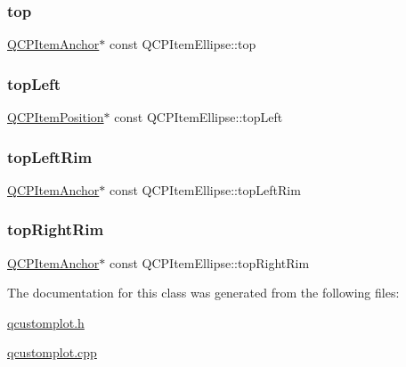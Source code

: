 \mbox{\label{class_q_c_p_item_ellipse_ad50f907d6f9d1402c6c5d302dca5c5d5}} 
\subsubsection{\texorpdfstring{top}{top}}
{\footnotesize\ttfamily \hyperlink{class_q_c_p_item_anchor}{Q\+C\+P\+Item\+Anchor}$\ast$ const Q\+C\+P\+Item\+Ellipse\+::top}

\mbox{\label{class_q_c_p_item_ellipse_a12fd8420c06718d0c8a2303d6a652848}} 
\subsubsection{\texorpdfstring{top\+Left}{topLeft}}
{\footnotesize\ttfamily \hyperlink{class_q_c_p_item_position}{Q\+C\+P\+Item\+Position}$\ast$ const Q\+C\+P\+Item\+Ellipse\+::top\+Left}

\mbox{\label{class_q_c_p_item_ellipse_a33ebd2a751b63b9240edc9aa46c19eff}} 
\subsubsection{\texorpdfstring{top\+Left\+Rim}{topLeftRim}}
{\footnotesize\ttfamily \hyperlink{class_q_c_p_item_anchor}{Q\+C\+P\+Item\+Anchor}$\ast$ const Q\+C\+P\+Item\+Ellipse\+::top\+Left\+Rim}

\mbox{\label{class_q_c_p_item_ellipse_a744446970b38a4a3bbea46d722b7c54d}} 
\subsubsection{\texorpdfstring{top\+Right\+Rim}{topRightRim}}
{\footnotesize\ttfamily \hyperlink{class_q_c_p_item_anchor}{Q\+C\+P\+Item\+Anchor}$\ast$ const Q\+C\+P\+Item\+Ellipse\+::top\+Right\+Rim}



The documentation for this class was generated from the following files\+:\begin{DoxyCompactItemize}
\item 
\hyperlink{qcustomplot_8h}{qcustomplot.\+h}\item 
\hyperlink{qcustomplot_8cpp}{qcustomplot.\+cpp}\end{DoxyCompactItemize}
